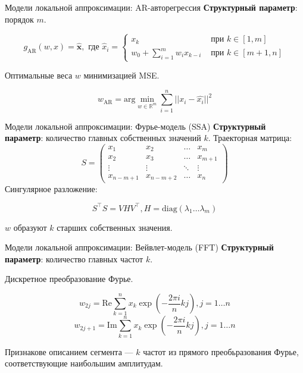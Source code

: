 \documentclass{beamer}
\newcommand{\bx}{\mathbf{x}}
\newcommand{\R}{\mathbb{R}}
\begin{document}
\begin{frame}{Модели локальной аппроксимации: AR-авторегрессия}
    \textbf{Структурный параметр}: порядок $m$.

$$
g_{\text{AR}}(w, x) = \hat{\bx}, \text{ где }
\hat{x}_i = \begin{cases}
    x_k & \text{ при } k \in [1, m] \\
    w_0 + \sum_{i=1}^m w_i x_{k - i} & \text{ при } k \in [m + 1, n]
\end{cases}
$$

Оптимальные веса $w$ минимизацией MSE.

$$
w_{\text{AR}} = \mathrm{arg}\min_{w \in \R^m} \sum_{i=1}^{n}||x_i - \hat{x_i}||^2
$$
\end{frame}


\begin{frame}{Модели локальной аппроксимации: Фурье-модель (SSA)}
    \textbf{Структурный параметр}: количество главных собственных значений $k$.
    Траекторная матрица:
$$
    S = \begin{pmatrix}
    x_1 & x_2 & \dots & x_m \\
    x_2 & x_3 & \dots & x_{m + 1} \\
    \vdots & \vdots & \ddots & \vdots \\
    x_{n - m + 1} & x_{n - m + 2} & \dots & x_n
    \end{pmatrix}
$$
Сингулярное разложение:

$$
S^\intercal S = VHV^\intercal, H = \mathrm{diag}(\lambda_1 \ldots \lambda_m)
$$

$w$ образуют $k$ старших собственных значения.
\end{frame}


\begin{frame}{Модели локальной аппроксимации: Вейвлет-модель (FFT)}
    \textbf{Структурный параметр}: количество главных частот $k$.

Дискретное преобразование Фурье.

$$
    w_{2j} = \mathrm{Re} \sum_{k=1}^{n} x_k \exp(-\frac{2\pi i}{n}kj), j=1\ldots n
$$
$$
    w_{2j + 1} = \mathrm{Im} \sum_{k=1}^{n} x_k \exp(-\frac{2\pi i}{n}kj), j=1\ldots n
$$

Признакове описанием сегмента — $k$ частот из прямого преобьразования Фурье,
соответствующие наибольшим амплитудам.

\end{frame}
\end{document}
